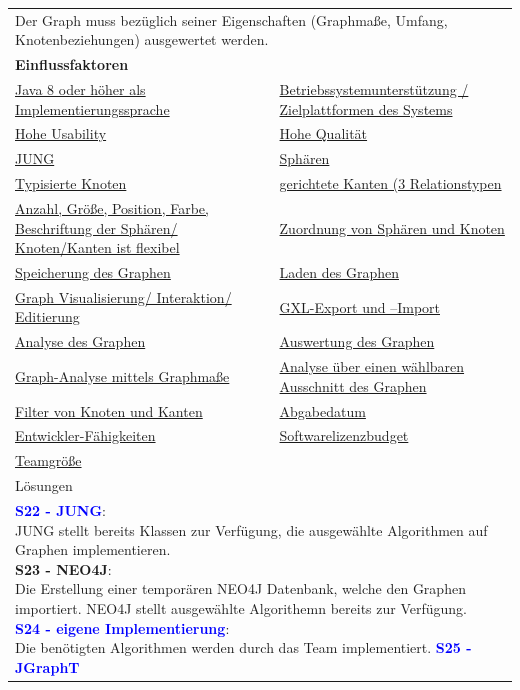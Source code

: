 \documentclass[enabledeprecatedfontcommands,fontsize=11pt,paper=a4,twoside]{scrartcl}
\newcommand{\cb}[1]{{\textcolor{blue}{#1}}}
\begin{document}
\newpage
\hspace{-0.65cm}
\begin{tabular} {|p{8cm} p{8cm}|}
	\hline
	\rowcolor{prob}\multicolumn{2}{|l|}{\parbox{16cm}{\textbf{08: Auswertung von Grapheigenschaften}}} \\  \hline\hline 
	\multicolumn{2}{|l|}{\parbox{16cm}{Der Graph muss bezüglich seiner Eigenschaften (Graphmaße, Umfang, Knotenbeziehungen) ausgewertet werden.}}\rule{0pt}{4ex}\\ [1ex] \hline
	\multicolumn{2}{|l|}{\textbf{Einflussfaktoren}}\\
	\hyperlink{b}{Java 8 oder höher als Implementierungssprache} &
	\hyperlink {f}{Betriebssystemunterstützung / Zielplattformen des Systems}\\
	\hyperlink {g}{Hohe Usability}&
	\hyperlink {h}{Hohe Qualität}\\
	\hyperlink {k}{JUNG} &
	\hyperlink {n}{Sphären} \\
	\hyperlink {p}{Typisierte Knoten} &
	\hyperlink {q}{gerichtete Kanten (3 Relationstypen}\\
	\hyperlink {r}{Anzahl, Größe, Position, Farbe, Beschriftung der Sphären/ Knoten/Kanten ist flexibel} &
	\hyperlink {t}{Zuordnung von Sphären und Knoten} \\
	\hyperlink {v}{Speicherung des Graphen} &
	\hyperlink {w}{Laden des Graphen} \\
	\hyperlink {aa}{Graph Visualisierung/ Interaktion/ Editierung}&
	\hyperlink {jj}{GXL-Export und –Import} \\
	\hyperlink {oo}{Analyse des Graphen} &
	\hyperlink {pp}{Auswertung des Graphen} \\
	\hyperlink {qq}{Graph-Analyse mittels Graphmaße} &
	\hyperlink {rr}{Analyse über einen wählbaren Ausschnitt des Graphen} \\ 
	\hyperlink {ss}{Filter von Knoten und Kanten} &
	\hyperlink {uu}{Abgabedatum} \\
	\hyperlink {vv}{Entwickler-Fähigkeiten} &
	\hyperlink {ww}{Softwarelizenzbudget} \\
	\hyperlink {xx}{Teamgröße} &
	\\ \hline
	\multicolumn{2}{|l|}{Lösungen} \\
	\multicolumn{2}{|l|}{\parbox{16cm}{
			\textbf{\cb{\hypertarget{fff}{S22 - JUNG}}}: \\
			JUNG stellt bereits Klassen zur Verfügung, die ausgewählte Algorithmen auf Graphen implementieren. \\
			\textbf{S23 - NEO4J}: \\
			Die Erstellung einer temporären NEO4J Datenbank, welche den Graphen importiert. NEO4J stellt ausgewählte Algorithemn bereits zur Verfügung. \\
			\textbf{\cb{S24 - eigene Implementierung}}: \\
			Die benötigten Algorithmen werden durch das Team implementiert.
			\textbf{\cb{S25 - JGraphT}}
	} }\\ [11ex] \hline
\end{tabular}\\ \\ \\
\end{document}
